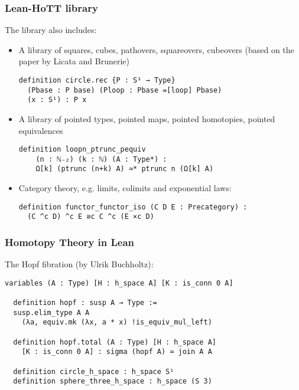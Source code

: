 \documentclass[xcolor=table]{beamer}
\newcommand{\na}{\mbox{}\\}
\newcommand{\nn}{\mbox{}\\ \mbox{}\\}
\begin{document}


\begin{frame}[fragile]
\frametitle{Lean-HoTT library}
The library also includes:
\begin{itemize}
\item A library of squares, cubes, pathovers, squareovers, cubeovers (based on the paper by Licata and Brunerie)
\begin{lstlisting}
definition circle.rec {P : S¹ → Type}
  (Pbase : P base) (Ploop : Pbase =[loop] Pbase)
  (x : S¹) : P x
\end{lstlisting}
\item<2-> A library of pointed types, pointed maps, pointed homotopies, pointed equivalences
\begin{lstlisting}[gobble=2]
  definition loopn_ptrunc_pequiv
    (n : ℕ₋₂) (k : ℕ) (A : Type*) :
    Ω[k] (ptrunc (n+k) A) ≃* ptrunc n (Ω[k] A)
\end{lstlisting}

\item<3-> Category theory, e.g. limits, colimits and exponential laws:
\begin{lstlisting}
definition functor_functor_iso (C D E : Precategory) :
  (C ^c D) ^c E ≅c C ^c (E ×c D)
\end{lstlisting}
\end{itemize}
\end{frame}


\begin{frame}[fragile]
\frametitle{Homotopy Theory in Lean}
The Hopf fibration (by Ulrik Buchholtz):
\begin{lstlisting}[gobble=2]
  variables (A : Type) [H : h_space A] [K : is_conn 0 A]

  definition hopf : susp A → Type :=
  susp.elim_type A A
    (λa, equiv.mk (λx, a * x) !is_equiv_mul_left)

  definition hopf.total (A : Type) [H : h_space A]
    [K : is_conn 0 A] : sigma (hopf A) ≃ join A A

  definition circle_h_space : h_space S¹
  definition sphere_three_h_space : h_space (S 3)
\end{lstlisting}

\end{frame}
\end{document}
